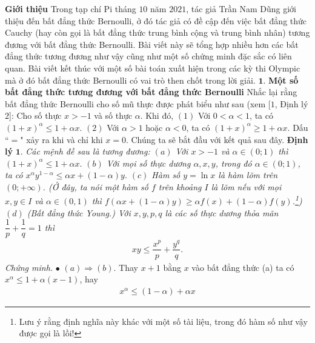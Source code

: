\begin{multicols}{2}
		\textbf{\color{hoccungpi}Giới thiệu}
		\vskip 0.1cm
		Trong tạp chí Pi tháng $10$ năm $2021$, tác giả Trần Nam Dũng  giới thiệu đến bất đẳng thức Bernoulli, ở đó tác giả có đề cập đến việc bất đẳng thức Cauchy (hay còn gọi là bất đẳng thức trung bình cộng và trung bình nhân) tương đương với bất đẳng thức Bernoulli. Bài viết này sẽ tổng hợp nhiều hơn các bất đẳng thức tương đương như vậy cũng như một số chứng minh đặc sắc có liên quan. Bài viết kết thúc với một số bài toán xuất hiện trong các kỳ thi Olympic mà ở đó bất đẳng thức Bernoulli có vai trò then chốt trong lời giải.
		\vskip 0.1cm
		$\pmb{1.}$ \textbf{\color{hoccungpi}Một số bất đẳng thức tương đương với bất đẳng thức Bernoulli}
		\vskip 0.1cm
		Nhắc lại rằng bất đẳng thức Bernoulli cho số mũ thực được phát biểu như sau (xem [$1$, Định lý $2$]: Cho số thực $x > -1$ và số thực $\alpha$. Khi đó, 
		\vskip 0.1cm
		$(1)$ Với $0 < \alpha < 1$, ta có  $(1+x)^\alpha \le 1 + \alpha x$.
		\vskip 0.1cm
		$(2)$ Với  $\alpha > 1$ hoặc $\alpha < 0$, ta có  $(1+x)^\alpha \ge 1 + \alpha x$.
		\vskip 0.1cm
		Dấu ``$=$" xảy ra khi và chỉ khi $x = 0$.
		\vskip 0.1cm
		Chúng ta sẽ bắt đầu với  kết quả sau đây.
		\vskip 0.1cm
		\textbf{\color{hoccungpi}Định lý} $\pmb{1.}$ \textit{Các mệnh đề sau là tương đương:
		\vskip 0.1cm
		$(a)$ Với $x>-1$ và $\alpha \in (0;1)$ thì $(1+x)^{\alpha} \le 1+\alpha x.$
		\vskip 0.1cm
		$(b)$ Với mọi số thực dương $\alpha, x,y$, trong đó $\alpha \in (0;1)$, ta có
		$x^{\alpha}y^{1-\alpha} \le \alpha x +(1-\alpha)y.$
		\vskip 0.1cm
		$(c)$ Hàm số $y=\ln x$ là hàm lõm trên $(0;+\infty)$. (Ở đây, ta nói một hàm số $f$ trên khoảng $I$ là lõm nếu với mọi $x, y\in I$ và $\alpha \in (0, 1)$ thì $f(\alpha x+(1-\alpha) y) \ge \alpha f(x) + (1-\alpha)f(y)$.\footnote[2]{\color{hoccungpi}Lưu ý rằng định nghĩa này khác với một số tài liệu, trong đó hàm số như vậy được gọi là lồi!})
		\vskip 0.1cm
		$(d)$ (Bất đẳng thức Young.) Với $x,y,p,q$ là các số thực dương thỏa mãn
		$\dfrac{1}{p}+\dfrac{1}{q}=1$ thì 
		\begin{align*}
			xy \le \dfrac{x^{p}}{p}+\dfrac{y^{q}}{q}.
		\end{align*}}
		\textit{Chứng minh.}
		\setlength{\abovedisplayskip}{7.2pt}
		\setlength{\belowdisplayskip}{7.2pt}
		\vskip 0.1cm
		$\bullet$ $(a) \Rightarrow (b)$.  Thay $x+1$ bằng $x$ vào bất đẳng thức (a) ta có $x^{\alpha} \le 1+\alpha(x-1)$, hay 
		\begin{align*}
			x^{\alpha} \le (1-\alpha) + \alpha x
		\end{align*}

\end{multicols}

